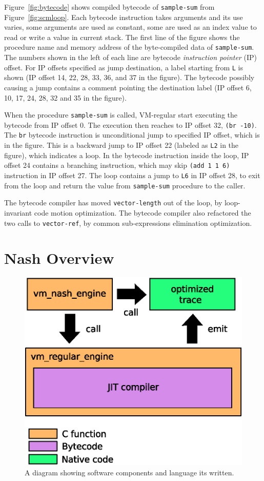 \documentclass[preprint, numbers]{sigplanconf}
\begin{document}
Figure~\hyperref[fig:bytecode]{\ref{fig:bytecode}} shows compiled bytecode of
\texttt{sample-sum} from
Figure~\hyperref[fig:scmloop]{\ref{fig:scmloop}}. Each bytecode instruction
takes arguments and its use varies, some arguments are used as constant, some
are used as an index value to read or write a value in current stack. The
first line of the figure shows the procedure name and memory address of the
byte-compiled data of \texttt{sample-sum}. The numbers shown in the left of
each line are bytecode \textit{instruction pointer} (IP) offset. For IP
offsets specified as jump destination, a label starting from \texttt{L} is
shown (IP offset 14, 22, 28, 33, 36, and 37 in the figure). The bytecode
possibly causing a jump contains a comment pointing the destination label (IP
offset 6, 10, 17, 24, 28, 32 and 35 in the figure).

When the procedure \texttt{sample-sum} is called, VM-regular start executing
the bytecode from IP offset 0. The execution then reaches to IP offset 32,
\texttt{(br -10)}. The \texttt{br} bytecode instruction is unconditional jump
to specified IP offset, which is  in the figure. This is a backward jump to
IP offset 22 (labeled as \texttt{L2} in the figure), which indicates a
loop. In the bytecode instruction inside the loop, IP offset 24 contains a
branching instruction, which may skip \texttt{(add 1 1 6)} instruction in IP
offset 27. The loop contains a jump to \texttt{L6} in IP offset 28, to exit
from the loop and return the value from \texttt{sample-sum} procedure to the
caller.

The bytecode compiler has moved \texttt{vector-length} out of the loop, by
loop-invariant code motion optimization. The bytecode compiler also refactored
the two calls to \texttt{vector-ref}, by common sub-expressions elimination
optimization.

\section{Nash Overview}
\label{sec:overview}


\begin{figure}
  \centering \includegraphics[width=0.4 \textwidth]{overview}
  \caption{A diagram showing software components and language its written.}
\label{fig:overview}
\end{figure}
\end{document}
